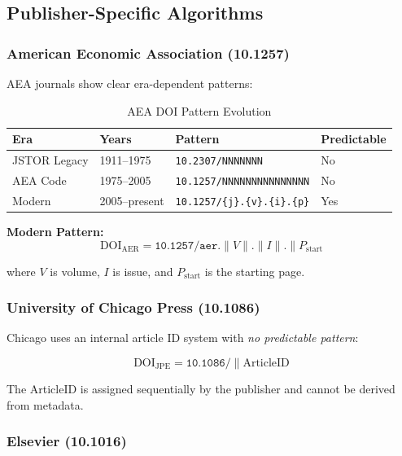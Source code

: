 \subsection{Publisher-Specific Algorithms}

\subsubsection{American Economic Association (10.1257)}

AEA journals show clear era-dependent patterns:

\begin{table}[h]
\centering
\caption{AEA DOI Pattern Evolution}
\begin{tabular}{llll}
\toprule
\textbf{Era} & \textbf{Years} & \textbf{Pattern} & \textbf{Predictable} \\
\midrule
JSTOR Legacy & 1911--1975 & \texttt{10.2307/NNNNNNN} & No \\
AEA Code & 1975--2005 & \texttt{10.1257/NNNNNNNNNNNNNNN} & No \\
Modern & 2005--present & \texttt{10.1257/\{j\}.\{v\}.\{i\}.\{p\}} & Yes \\
\bottomrule
\end{tabular}
\end{table}

\textbf{Modern Pattern:}
\begin{equation}
\text{DOI}_{\text{AER}} = \texttt{10.1257/aer.} \| V \| \texttt{.} \| I \| \texttt{.} \| P_{\text{start}}
\end{equation}

where $V$ is volume, $I$ is issue, and $P_{\text{start}}$ is the starting page.

\subsubsection{University of Chicago Press (10.1086)}

Chicago uses an internal article ID system with \emph{no predictable pattern}:

\begin{equation}
\text{DOI}_{\text{JPE}} = \texttt{10.1086/} \| \text{ArticleID}
\end{equation}

The ArticleID is assigned sequentially by the publisher and cannot be derived from metadata.

\subsubsection{Elsevier (10.1016)}

